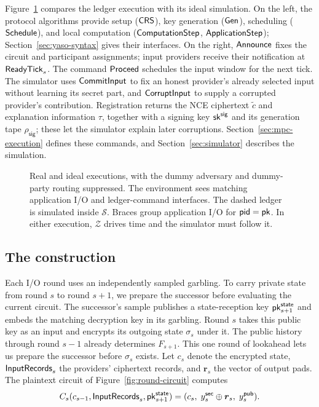 Figure~\ref{fig:model-simulation} compares the ledger execution with its
ideal simulation.  On the left, the protocol algorithms provide setup
($\mathsf{CRS}$), key generation ($\mathsf{Gen}$), scheduling ($\mathsf{Schedule}$), and local
computation ($\mathsf{ComputationStep}$, $\mathsf{ApplicationStep}$);
Section~\ref{sec:yaso-syntax} gives their interfaces.
On the right, $\mathsf{Announce}$ fixes the circuit and participant assignments;
input providers receive their notification at $\mathsf{ReadyTick}_s$.
The command $\mathsf{Proceed}$ schedules the input window for the next tick.
The simulator uses $\mathsf{CommitInput}$ to fix an honest provider's already
selected input without learning its secret part, and $\mathsf{CorruptInput}$ to
supply a corrupted provider's contribution.  Registration returns the NCE
ciphertext $\widetilde c$ and explanation information $\tau$, together
with a signing key $\mathsf{sk}^{\mathsf{sig}}$ and its generation tape $\rho_{\mathsf{sig}}$;
these let the simulator explain later corruptions.
Section~\ref{sec:mpc-execution} defines these commands, and
Section~\ref{sec:simulator} describes the simulation.

\begin{figure}[tp]
\centering
\resizebox{\linewidth}{!}{}
\caption{Real and ideal executions, with the dummy adversary and dummy-party
routing suppressed.  The environment sees matching application I/O and
ledger-command interfaces.  The dashed ledger is simulated inside
$\mathcal S$.  Braces group application I/O for $\mathsf{pid}=\mathsf{pk}$.
In either execution, $\mathcal Z$ drives time and the simulator must follow it.}
\label{fig:model-simulation}
\end{figure}

\subsection{The construction}
\label{sec:overview-construction}

Each I/O round uses an independently sampled garbling.  To carry private
state from round $s$ to round $s+1$, we prepare the successor before
evaluating the current circuit.  The successor's sample publishes a
state-reception key $\mathsf{pk}^{\mathsf{state}}_{s+1}$ and embeds the matching decryption
key in its garbling.  Round $s$ takes this public key as an input and
encrypts its outgoing state $\sigma_s$ under it.  The public history
through round $s-1$ already determines $F_{s+1}$.  This one round of
lookahead lets us prepare the successor before $\sigma_s$ exists.
Let $c_s$ denote the encrypted state, $\mathsf{InputRecords}_s$ the providers'
ciphertext records, and $\boldsymbol r_s$ the vector of output pads.
The plaintext circuit of Figure~\ref{fig:round-circuit} computes
\[
 C_s(c_{s-1},\mathsf{InputRecords}_s,\mathsf{pk}^{\mathsf{state}}_{s+1})
   = (c_s,\;y^{\mathsf{sec}}_s\oplus\boldsymbol r_s,\;y^{\mathsf{pub}}_s).
\]

